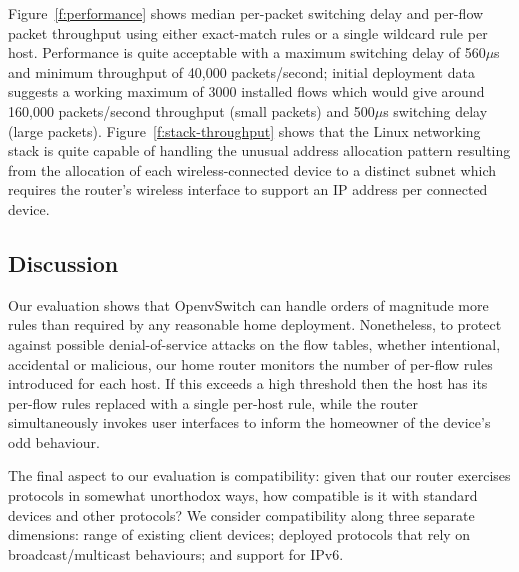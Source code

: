 Figure~\ref{f:performance} shows median per-packet switching delay and per-flow
packet throughput using either exact-match rules or a single wildcard rule per
host.  Performance is quite acceptable with a maximum switching delay of
560$\mu$s and minimum throughput of 40,000 packets/second; initial deployment
data suggests a working maximum of 3000 installed flows which would give around
160,000 packets/second throughput (small packets) and 500$\mu$s switching delay
(large packets).  Figure~\ref{f:stack-throughput} shows that the Linux
networking stack is quite capable of handling the unusual address allocation
pattern resulting from the allocation of each wireless-connected device to a
distinct subnet which requires the router's wireless interface to support an IP
address per connected device. 

\subsection{Discussion}

Our evaluation shows that OpenvSwitch can handle orders of magnitude more rules
than required by any reasonable home deployment.  Nonetheless, to protect
against possible denial-of-service attacks on the flow tables, whether
intentional, accidental or malicious, our home router monitors the number of
per-flow rules introduced for each host.  If this exceeds a high threshold then
the host has its per-flow rules replaced with a single per-host rule, while the
router simultaneously invokes user interfaces to inform the homeowner of the
device's odd behaviour. 

The final aspect to our evaluation is compatibility: given that our router
exercises protocols in somewhat unorthodox ways, how compatible is it with
standard devices and other protocols?  We consider compatibility along three
separate dimensions: range of existing client devices; deployed protocols that
rely on broadcast/multicast behaviours; and support for IPv6. 


